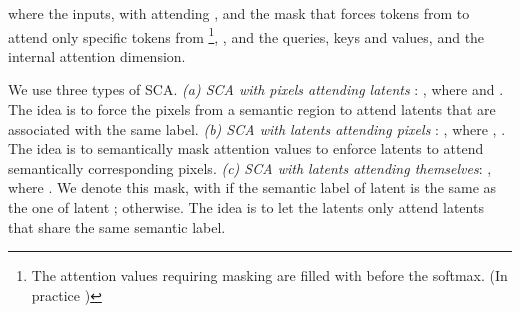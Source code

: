 \documentclass[runningheads]{llncs}
\begin{document}
\begin{footnotesize}

\end{footnotesize}
\noindent where  the inputs, with  attending , and  the mask that forces tokens from  to attend only specific tokens from \footnote{{\label{fnote1}}The attention values requiring masking are filled with  before the softmax. (In practice ) }, ,  and  the queries, keys and values, and  the internal attention dimension.

We use three types of SCA. 
\noindent \textit{(a) SCA with pixels  attending latents }: , where  and .
The idea is to force the pixels from a semantic region to attend latents that are associated with the same label. 
\noindent \textit{(b) SCA with latents  attending pixels }: , where , . 
The idea is to semantically mask attention values to enforce latents to attend semantically corresponding pixels.
\noindent \textit{(c) SCA with latents  attending themselves}: , where . We denote  this mask, with  if the semantic label of latent  is the same as the one of latent ;  otherwise.
The idea is to let the latents only attend latents that share the same semantic label. 
\begin{comment}

\noindent \textbf{SCA with pixels  attending latents .}
The idea is to destroy any attention values where the pixel from a semantic region is not attending the latents from that semantic region\footnote{{\label{fnote1}}The attention values requiring masking are filled with a very small value  before the softmax.}.
It is computed using the following equation: 

\begin{footnotesize}

\end{footnotesize}

\noindent where ,  and  are the queries, keys and values with ,  and , respectively,  being the internal attention dimension.

\noindent \textbf{SCA with latents  attending pixels .}
The idea is to semantically mask attention values to enforce latents to attend semantically corresponding pixels\footref{fnote1}. It is computed by: 

\begin{footnotesize}

\end{footnotesize}

\noindent where ,  and  are the queries, keys and values with ,  and , respectively,  being the internal attention dimension.

\end{comment}
 
\end{document}
